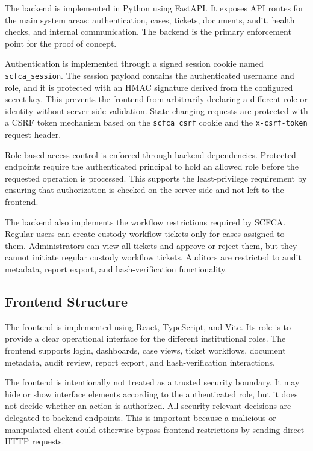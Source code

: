 \documentclass[12pt,a4paper]{report}
\begin{document}
The backend is implemented in Python using FastAPI. It exposes API routes for the main system areas: authentication, cases, tickets, documents, audit, health checks, and internal communication. The backend is the primary enforcement point for the proof of concept.

Authentication is implemented through a signed session cookie named \texttt{scfca\_session}. The session payload contains the authenticated username and role, and it is protected with an HMAC signature derived from the configured secret key. This prevents the frontend from arbitrarily declaring a different role or identity without server-side validation. State-changing requests are protected with a CSRF token mechanism based on the \texttt{scfca\_csrf} cookie and the \texttt{x-csrf-token} request header.

Role-based access control is enforced through backend dependencies. Protected endpoints require the authenticated principal to hold an allowed role before the requested operation is processed. This supports the least-privilege requirement by ensuring that authorization is checked on the server side and not left to the frontend.

The backend also implements the workflow restrictions required by SCFCA. Regular users can create custody workflow tickets only for cases assigned to them. Administrators can view all tickets and approve or reject them, but they cannot initiate regular custody workflow tickets. Auditors are restricted to audit metadata, report export, and hash-verification functionality.

\subsection{Frontend Structure}

The frontend is implemented using React, TypeScript, and Vite. Its role is to provide a clear operational interface for the different institutional roles. The frontend supports login, dashboards, case views, ticket workflows, document metadata, audit review, report export, and hash-verification interactions.

The frontend is intentionally not treated as a trusted security boundary. It may hide or show interface elements according to the authenticated role, but it does not decide whether an action is authorized. All security-relevant decisions are delegated to backend endpoints. This is important because a malicious or manipulated client could otherwise bypass frontend restrictions by sending direct HTTP requests.
\end{document}
